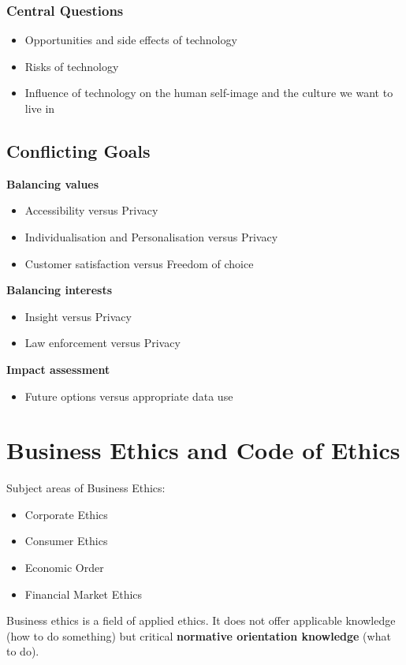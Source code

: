 \documentclass[11pt]{article}
\theoremstyle{definition}
\begin{document}
\subsubsection{Central Questions}
\begin{itemize}
	\item Opportunities and side effects of technology
	\item Risks of technology
	\item Influence of technology on the human self-image and the culture we want to live in
\end{itemize}

\subsection{Conflicting Goals}
\textbf{Balancing values}
\begin{itemize}[label=-]
	\item Accessibility versus Privacy
	\item Individualisation and Personalisation versus Privacy
	\item Customer satisfaction versus Freedom of choice
\end{itemize}
\textbf{Balancing interests}
\begin{itemize}[label=-]
	\item Insight versus Privacy
	\item Law enforcement versus Privacy
\end{itemize}
\textbf{Impact assessment}
\begin{itemize}[label=-]
	\item Future options versus appropriate data use
\end{itemize}

\section{Business Ethics and Code of Ethics}
Subject areas of Business Ethics:
\begin{itemize}
	\item Corporate Ethics
	\item Consumer Ethics
	\item Economic Order
	\item Financial Market Ethics
\end{itemize}
\begin{definition}
	Business ethics is a field of applied ethics. It does not offer applicable knowledge (how to do something) but critical \textbf{normative orientation knowledge} (what to do).
\end{definition}
\end{document}
